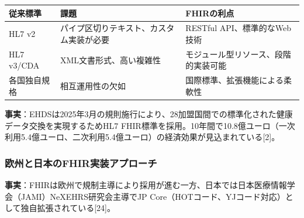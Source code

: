 \documentclass[
  a4paper,
  a4paper,
  11pt]{ltjsbook}
\begin{document}
\begin{longtable}[]{@{}
  >{\raggedright\arraybackslash}p{}
  >{\raggedright\arraybackslash}p{}
  >{\raggedright\arraybackslash}p{}@{}}
\toprule\noalign{}
\begin{minipage}[b]{\linewidth}\raggedright
従来標準
\end{minipage} & \begin{minipage}[b]{\linewidth}\raggedright
課題
\end{minipage} & \begin{minipage}[b]{\linewidth}\raggedright
FHIRの利点
\end{minipage} \\
\midrule\noalign{}
\endhead
\bottomrule\noalign{}
\endlastfoot
HL7 v2 & パイプ区切りテキスト、カスタム実装が必要 & RESTful
API、標準的なWeb技術 \\
HL7 v3/CDA & XML文書形式、高い複雑性 &
モジュール型リソース、段階的実装可能 \\
各国独自規格 & 相互運用性の欠如 & 国際標準、拡張機能による柔軟性 \\
\end{longtable}

\textbf{事実}：EHDSは2025年3月の規則施行により、28加盟国間での標準化された健康データ交換を実現するためHL7
FHIR標準を採用。10年間で10.8億ユーロ（一次利用5.4億ユーロ、二次利用5.4億ユーロ）の経済効果が見込まれている{[}2{]}。

\subsubsection{欧州と日本のFHIR実装アプローチ}\label{ux6b27ux5ddeux3068ux65e5ux672cux306efhirux5b9fux88c5ux30a2ux30d7ux30edux30fcux30c1}

\textbf{事実}：FHIRは欧州で規制主導により採用が進む一方、日本では日本医療情報学会（JAMI）NeXEHRS研究会主導でJP
Core（HOTコード、YJコード対応）として独自拡張されている{[}24{]}。
\end{document}
